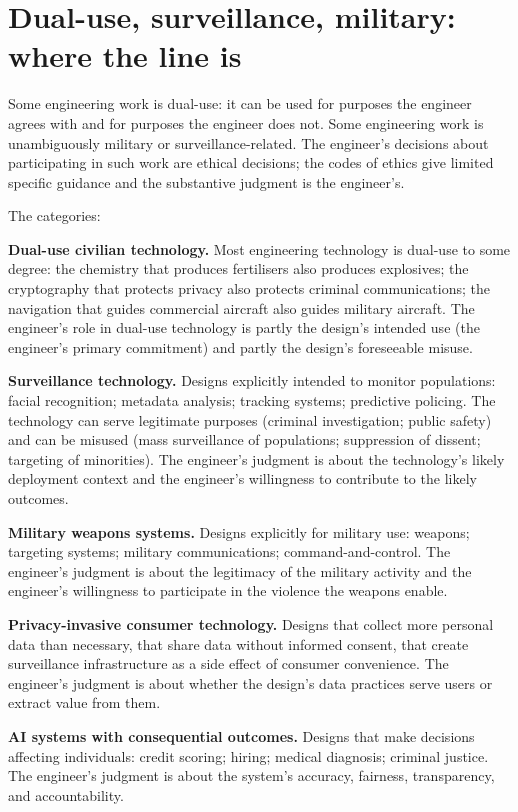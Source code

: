 \section{Dual-use, surveillance, military: where the line is}

Some engineering work is dual-use: it can be used for purposes the engineer agrees with and for purposes the engineer does not. Some engineering work is unambiguously military or surveillance-related. The engineer's decisions about participating in such work are ethical decisions; the codes of ethics give limited specific guidance and the substantive judgment is the engineer's.

The categories:

\textbf{Dual-use civilian technology.} Most engineering technology is dual-use to some degree: the chemistry that produces fertilisers also produces explosives; the cryptography that protects privacy also protects criminal communications; the navigation that guides commercial aircraft also guides military aircraft. The engineer's role in dual-use technology is partly the design's intended use (the engineer's primary commitment) and partly the design's foreseeable misuse.

\textbf{Surveillance technology.} Designs explicitly intended to monitor populations: facial recognition; metadata analysis; tracking systems; predictive policing. The technology can serve legitimate purposes (criminal investigation; public safety) and can be misused (mass surveillance of populations; suppression of dissent; targeting of minorities). The engineer's judgment is about the technology's likely deployment context and the engineer's willingness to contribute to the likely outcomes.

\textbf{Military weapons systems.} Designs explicitly for military use: weapons; targeting systems; military communications; command-and-control. The engineer's judgment is about the legitimacy of the military activity and the engineer's willingness to participate in the violence the weapons enable.

\textbf{Privacy-invasive consumer technology.} Designs that collect more personal data than necessary, that share data without informed consent, that create surveillance infrastructure as a side effect of consumer convenience. The engineer's judgment is about whether the design's data practices serve users or extract value from them.

\textbf{AI systems with consequential outcomes.} Designs that make decisions affecting individuals: credit scoring; hiring; medical diagnosis; criminal justice. The engineer's judgment is about the system's accuracy, fairness, transparency, and accountability.

